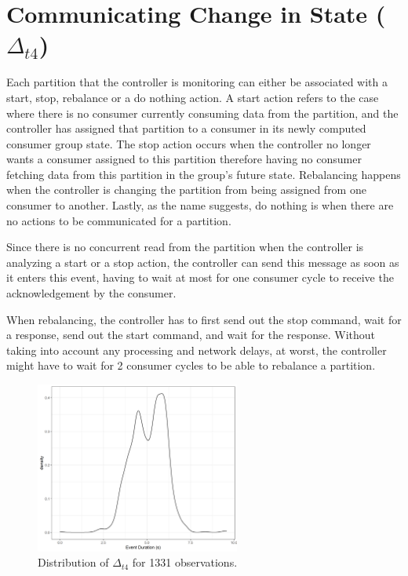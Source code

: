 \section{Communicating Change in State ($\Delta_{t4}$)}

Each partition that the controller is monitoring can either be associated with a
start, stop, rebalance or a do nothing action. A start action refers to the case
where there is no consumer currently consuming data from the partition, and the
controller has assigned that partition to a consumer in its newly computed
consumer group state. The stop action occurs when the controller no longer wants
a consumer assigned to this partition therefore having no consumer fetching data
from this partition in the group's future state. Rebalancing happens when the
controller is changing the partition from being assigned from one consumer to
another. Lastly, as the name suggests, do nothing is when there are no actions to
be communicated for a partition. 

Since there is no concurrent read from the partition when the controller is
analyzing a start or a stop action, the controller can send this message as soon
as it enters this event, having to wait at most for one consumer cycle to receive
the acknowledgement by the consumer. 

When rebalancing, the controller has to first send out the stop command, wait
for a response, send out the start command, and wait for the response. Without
taking into account any processing and network delays, at worst, the controller
might have to wait for 2 consumer cycles to be able to rebalance a partition.

\begin{figure}[htb!]
\centering
\includegraphics[width=0.6\textwidth]{images/integration/delta4.png}
\caption{
    Distribution of $\Delta_{t4}$ for 1331 observations.
}
\label{fig:controller_result_change_state}
\end{figure}

